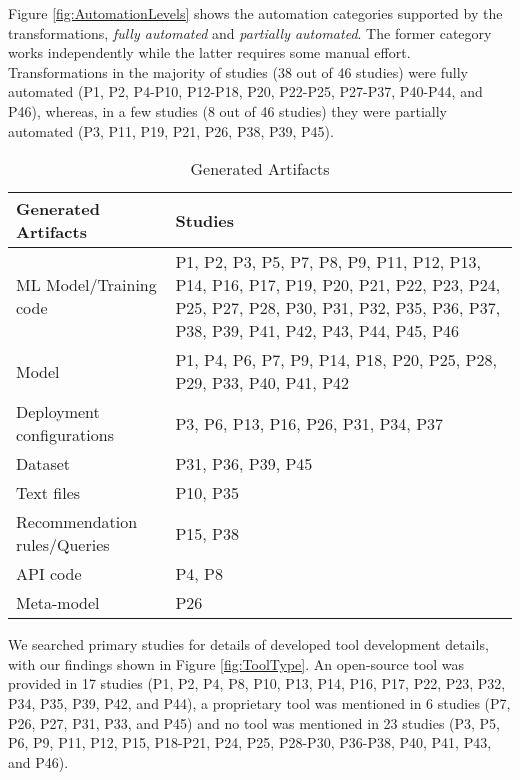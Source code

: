  Figure \ref{fig:AutomationLevels} shows the automation categories supported by the transformations, \textit{fully automated} and \textit{partially automated}. The former category works independently while the latter requires some manual effort. Transformations in the majority of studies (38 out of 46 studies) were fully automated (P1, P2, P4-P10, P12-P18, P20, P22-P25, P27-P37, P40-P44, and P46), whereas, in a few studies (8 out of 46 studies) they were partially automated (P3, P11, P19, P21, P26, P38, P39, P45).\\


\begin{table}[htbp]
\centering
\caption{Generated Artifacts}
\label{table:genArtifacts}
\footnotesize
\begin{tabular}{ p{5cm} p{10.5cm}  } 
\hline
\textbf{Generated Artifacts} & \textbf{Studies} \TBstrut \\
\hline
ML Model/Training code	  \TBstrut  & P1, P2, P3, P5, P7, P8, P9, P11, P12, P13, P14, P16, P17, P19, P20, P21, P22, P23, P24, P25, P27, P28, P30, P31, P32, P35, P36, P37, P38, P39, P41, P42, P43, P44, P45, P46\TBstrut \\ 
Model	                     & P1, P4, P6, P7, P9, P14, P18, P20, P25, P28, P29, P33, P40, P41, P42 \TBstrut \\
Deployment configurations    &	P3, P6, P13, P16, P26, P31, P34, P37\TBstrut \\ 
Dataset	                     & P31, P36, P39, P45\TBstrut \\ 
Text files	                 & P10, P35 \TBstrut \\ 
Recommendation rules/Queries & P15, P38 \TBstrut \\ 
API code	                 &  P4, P8\TBstrut \\ 
Meta-model	                 & P26\TBstrut \\ 
\hline
\end{tabular}

\end{table}

 We searched primary studies for details of developed tool development details, with our findings shown in Figure \ref{fig:ToolType}. An open-source tool was provided in 17 studies (P1, P2, P4, P8, P10, P13, P14, P16, P17, P22, P23, P32, P34, P35, P39, P42, and P44), a proprietary tool was mentioned in 6 studies (P7, P26, P27, P31, P33, and P45) and no tool was mentioned in 23 studies (P3, P5, P6, P9, P11, P12, P15, P18-P21, P24, P25, P28-P30, P36-P38, P40, P41, P43, and P46).\\


